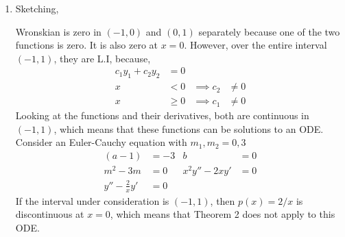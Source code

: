\begin{enumerate}
\begin{enumerate}
              \item Sketching,
                    \begin{figure}[H]
                        \centering
                    \end{figure}
                    Wronskian is zero in $ (-1,0) $ and $ (0, 1) $ separately because one of the two
                    functions is zero. It is also zero at $ x = 0 $. \newline
                    However, over the entire interval $ (-1, 1) $, they are L.I, because,
                    \begin{align}
                        c_{1}y_{1} + c_{2}y_{2} & = 0                               \\
                        x                       & < 0    & \implies  c_{2} & \neq 0 \\
                        x                       & \geq 0 & \implies  c_{1} & \neq 0
                    \end{align}
                    Looking at the functions and their derivatives, both are continuous in $ (-1, 1) $,
                    which means that these functions can be solutions to an ODE. \newline
                    Consider an Euler-Cauchy equation with $ m_{1}, m_{2} = 0, 3 $
                    \begin{align}
                        (a - 1)             & = -3 & b              & = 0 \\
                        m^{2}  - 3m         & = 0  & x^{2}y'' -2xy' & = 0 \\
                        y'' - \frac{2}{x}y' & = 0
                    \end{align}
                    If the interval under consideration is $ (-1, 1) $, then $ p(x) = 2/x $ is
                    discontinuous at $ x = 0 $, which means that Theorem 2 does not apply to
                    this ODE.


\end{enumerate}
\end{enumerate}
